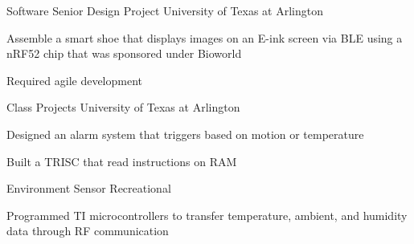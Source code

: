 


\begin{cventries}


\cventry
{} %
{Software Senior Design Project } %
{University of Texas at Arlington} %
{} %
{ %
\begin{cvitems}
\item {Assemble a smart shoe that displays images on an E-ink screen via BLE using a nRF52 chip that was sponsored under Bioworld}
\item {Required agile development}
\end{cvitems}
}

\cventry
{} %
{Class Projects} %
{University of Texas at Arlington} %
{} %
{ %
\begin{cvitems}
	\item {Designed an alarm system that triggers based on motion or temperature}
	\item {Built a TRISC that read instructions on RAM}
\end{cvitems}
}

\cventry
{} %
{Environment Sensor} %
{Recreational} %
{} %
{ %
\begin{cvitems}
\item { Programmed TI microcontrollers to transfer temperature, ambient, and humidity data through RF communication }
\end{cvitems}
}



\end{cventries}